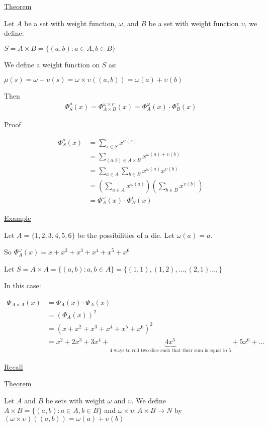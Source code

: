 \documentclass{article}
\begin{document}
\underline{Theorem}

Let $A$ be a set with weight function, $\omega$, and $B$ be a set with weight function $\upsilon$, we define:

$S = A \times B = \{(a,b): a \in A, b \in B\}$

We define a weight function on $S$ as:

$\mu(s) = \omega + \upsilon(s) = \omega \times \upsilon((a,b)) = \omega(a) + \upsilon(b)$

Then
\begin{align*}
\Phi_S^{\mu}(x) = \Phi_{A \times B}^{\omega \times \upsilon}(x) = \Phi_{A}^{\omega}(x) \cdot \Phi_{B}^{\upsilon}(x)
\end{align*}

\underline{Proof}

\begin{align*}
\Phi_{S}^{\sigma}(x) &= \sum_{s \in S}x^{\sigma(s)} \\
&= \sum_{(a,b) \in A \times B} x^{\omega(a) + \upsilon(b)} \\
&= \sum_{a \in A} \sum_{b \in B} x^{\omega(a)}x^{\upsilon(b)} \\ 
&= (\sum_{a \in A} x^{\omega(a)})(\sum_{b \in B}x^{\upsilon(b)}) \\
&= \Phi_{A}^{\omega}(x) \cdot \Phi_{B}^{\upsilon}(x)
\end{align*}

\underline{Example}

Let $A = \{1,2,3,4,5,6\}$ be the possibilities of a die. Let $\omega(a) = a$.

So $\Phi_{A}^{\omega}(x) = x+x^2+x^3+x^4+x^5+x^6$

Let $S = A \times A = \{(a,b) : a,b \in A\} = \{(1,1),(1,2),\ldots,(2,1)\ldots,\}$

In this case:

\begin{align*}
\Phi_{A \times A}(x) &= \Phi_{A}(x) \cdot \Phi_{A}(x) \\
&= (\Phi_{A}(x))^2 \\
&= (x+x^2+x^3+x^4+x^5+x^6)^2 \\
&= x^2 + 2x^3 + 3x^4 + \underbrace{4x^5}_{4\text{ ways to roll two dice such that their sum is equal to } 5} + 5x^6 + \ldots
\end{align*}

\underline{Recall}

\underline{Theorem}

Let $A$ and $B$ be sets with weight $\omega$ and $\upsilon$. We define $A \times B = \{(a,b):a \in A, b \in B\}$ and $\omega \times \upsilon : A \times B \to N$ by $(\omega \times \upsilon)((a,b)) = \omega(a) + \upsilon(b)$
\end{document}
